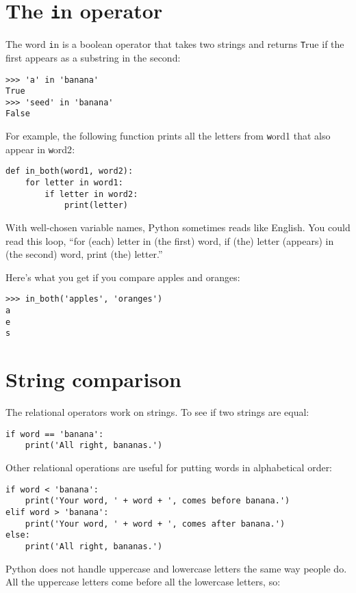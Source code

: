 \documentclass[
DIV=11,
fontsize=12,
twoside,
headinclude=false,
titlepage=firstiscover,
abstract=true,
headsepline=true,
footsepline=true,
chapterprefix=true, %
headings=big,
bibliography=totoc,%
captions=tableheading
]{scrbook}
\theoremstyle{definition}
\begin{document}
\section{The {\texttt in} operator}
\label{inboth}

The word {\texttt in} is a boolean operator that takes two strings and
returns {\texttt True} if the first appears as a substring in the second:

\begin{lstlisting}
>>> 'a' in 'banana'
True
>>> 'seed' in 'banana'
False
\end{lstlisting}
%
For example, the following function prints all the
letters from {\texttt word1} that also appear in {\texttt word2}:

\begin{lstlisting}
def in_both(word1, word2):
    for letter in word1:
        if letter in word2:
            print(letter)
\end{lstlisting}
%
With well-chosen variable names,
Python sometimes reads like English.  You could read
this loop, ``for (each) letter in (the first) word, if (the) letter 
(appears) in (the second) word, print (the) letter.''

Here's what you get if you compare apples and oranges:

\begin{lstlisting}
>>> in_both('apples', 'oranges')
a
e
s
\end{lstlisting}
%

\section{String comparison}

The relational operators work on strings.  To see if two strings are equal:

\begin{lstlisting}
if word == 'banana':
    print('All right, bananas.')
\end{lstlisting}
%
Other relational operations are useful for putting words in alphabetical
order:

\begin{lstlisting}
if word < 'banana':
    print('Your word, ' + word + ', comes before banana.')
elif word > 'banana':
    print('Your word, ' + word + ', comes after banana.')
else:
    print('All right, bananas.')
\end{lstlisting}
%
Python does not handle uppercase and lowercase letters the same way
people do.  All the uppercase letters come before all the
lowercase letters, so:
\end{document}
